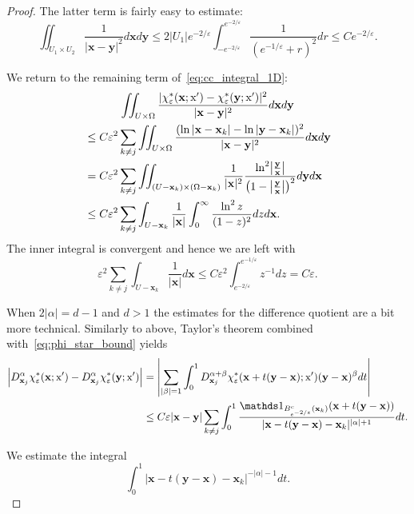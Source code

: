 \documentclass[10pt]{amsart}
\theoremstyle{definition}\newtheorem{defi}[theo]{Definition}\newtheorem{rema}[theo]{Remark}\newtheorem{exam}[theo]{Example}\newtheorem{exem}[theo]{Example}\newtheorem{nota}[theo]{Notation}
\newcommand*\eps{\varepsilon}
\newcommand\1{{\ensuremath {\mathds 1} }}
\newcommand{\bx}{\mathbf{x}}
\newcommand{\by}{\mathbf{y}}
\newcommand{\sx}{\textup{x}}
\begin{document}
\begin{proof}
The latter term is fairly easy to estimate:
\begin{equation*}
\iint_{U_1\times U_2} \frac{1}{|\bx-\by|^2}d\bx d\by
\leq 2|U_1| e^{-2/\eps}\int_{-e^{-2/\eps}}^{e^{-2/\eps}}\frac{1}{(e^{-1/\eps}+r)^2}dr \leq C e^{-2/\eps}.
\end{equation*}

We return to the remaining term of~\eqref{eq:cc_integral_1D}:
\begin{multline*}
\iint_{U\times \Omega}\frac{|\chi_\eps^*(\bx; \sx')-\chi_\eps^*(\by; \sx')|^2}{|\bx-\by|^2}d\bx d\by \\
\begin{aligned}
&\leq C\eps^2\sum_{k\neq j} \iint_{U\times \Omega} \frac{(\ln|\bx-\bx_k|-\ln|\by-\bx_k|)^2}{|\bx-\by|^2}d\bx d\by\\
&= C\eps^2 \sum_{k\neq j} \iint_{(U-\bx_k)\times(\Omega-\bx_k)}\frac{1}{|\bx|^2}\frac{\ln^2\bigl|\frac{\by}{\bx}\bigr|}{\bigl(1-\bigl|\frac{\by}{\bx}\bigr|\bigr)^2}d\by d\bx\\
&\leq C\eps^2\sum_{k\neq j} \int_{U-\bx_k}\frac{1}{|\bx|}\int_{0}^{\infty}\frac{\ln^2z}{(1-z)^2}dz d\bx.
\end{aligned}
\end{multline*}
The inner integral is convergent and hence we are left with
\begin{equation*}
\eps^2\sum_{k\neq j} \int_{U-\bx_k}\frac{1}{|\bx|} d\bx
\leq C\eps^2 \int_{e^{-2/\eps}}^{e^{-1/\eps}}z^{-1}dz= C\eps.
\end{equation*}





When $2|\alpha|=d-1$ and $d> 1$ the estimates for the difference quotient are a bit more technical. Similarly to above, Taylor's theorem combined with~\eqref{eq:phi_star_bound} yields
\begin{align*}
\left|D_{\bx_j}^\alpha \chi_\eps^*(\bx; \sx')-D^\alpha_{\bx_j} \chi_\eps^*(\by; \sx')\right| &=
\left|
\sum_{|\beta|=1}\int_0^1 D^{\alpha+\beta}_{\bx_j}\chi_\eps^*(\bx+t(\by-\bx); \sx')(\by-\bx)^\beta dt
\right|\\
&\leq C\eps |\bx-\by| \sum_{k\neq j}\int_0^1 \frac{\1_{B^c_{e^{-2/\eps}}(\bx_k)}(\bx+t(\by-\bx))}{|\bx-t(\by-\bx)-\bx_k|^{|\alpha|+1}}dt.
\end{align*}

We estimate the integral
\begin{equation*}
\int_0^1 |\bx-t(\by-\bx)-\bx_k|^{-|\alpha|-1}dt.
\end{equation*}


\end{proof}
\end{document}
